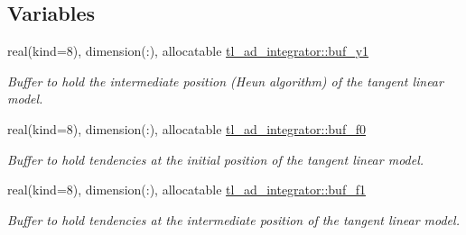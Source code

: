 \subsection*{Variables}
\begin{DoxyCompactItemize}
\item 
real(kind=8), dimension(\+:), allocatable \hyperlink{namespacetl__ad__integrator_a54c26282330477995b554805fbacf236}{tl\+\_\+ad\+\_\+integrator\+::buf\+\_\+y1}
\begin{DoxyCompactList}\small\item\em Buffer to hold the intermediate position (Heun algorithm) of the tangent linear model. \end{DoxyCompactList}\item 
real(kind=8), dimension(\+:), allocatable \hyperlink{namespacetl__ad__integrator_ad0e2f29027e4317cae009ca0c4ad1b5a}{tl\+\_\+ad\+\_\+integrator\+::buf\+\_\+f0}
\begin{DoxyCompactList}\small\item\em Buffer to hold tendencies at the initial position of the tangent linear model. \end{DoxyCompactList}\item 
real(kind=8), dimension(\+:), allocatable \hyperlink{namespacetl__ad__integrator_ac466cd6f698dc9fed5fc3ab46f30b9a5}{tl\+\_\+ad\+\_\+integrator\+::buf\+\_\+f1}
\begin{DoxyCompactList}\small\item\em Buffer to hold tendencies at the intermediate position of the tangent linear model. \end{DoxyCompactList}\end{DoxyCompactItemize}
